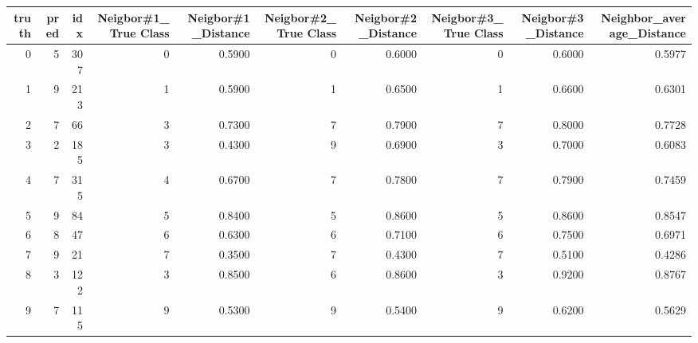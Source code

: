 \begin{tabular}{rrrrrrrrrr}
\toprule
 truth &  pred &  idx &  Neigbor\#1\_True Class &  Neigbor\#1\_Distance &  Neigbor\#2\_True Class &  Neigbor\#2\_Distance &  Neigbor\#3\_True Class &  Neigbor\#3\_Distance &  Neighbor\_average\_Distance \\
\midrule
     0 &     5 &  307 &                     0 &              0.5900 &                     0 &              0.6000 &                     0 &              0.6000 &                     0.5977 \\
     1 &     9 &  213 &                     1 &              0.5900 &                     1 &              0.6500 &                     1 &              0.6600 &                     0.6301 \\
     2 &     7 &   66 &                     3 &              0.7300 &                     7 &              0.7900 &                     7 &              0.8000 &                     0.7728 \\
     3 &     2 &  185 &                     3 &              0.4300 &                     9 &              0.6900 &                     3 &              0.7000 &                     0.6083 \\
     4 &     7 &  315 &                     4 &              0.6700 &                     7 &              0.7800 &                     7 &              0.7900 &                     0.7459 \\
     5 &     9 &   84 &                     5 &              0.8400 &                     5 &              0.8600 &                     5 &              0.8600 &                     0.8547 \\
     6 &     8 &   47 &                     6 &              0.6300 &                     6 &              0.7100 &                     6 &              0.7500 &                     0.6971 \\
     7 &     9 &   21 &                     7 &              0.3500 &                     7 &              0.4300 &                     7 &              0.5100 &                     0.4286 \\
     8 &     3 &  122 &                     3 &              0.8500 &                     6 &              0.8600 &                     3 &              0.9200 &                     0.8767 \\
     9 &     7 &  115 &                     9 &              0.5300 &                     9 &              0.5400 &                     9 &              0.6200 &                     0.5629 \\
\bottomrule
\end{tabular}
